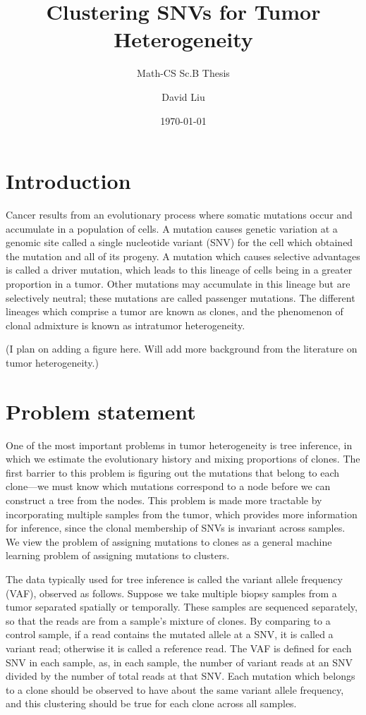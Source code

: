 \documentclass[11pt]{article}
\title{Clustering SNVs for Tumor Heterogeneity}
\subtitle{Math-CS Sc.B Thesis}
\date{\today}
\author{David Liu}
\begin{document}
\maketitle
\section{Introduction}
Cancer results from an evolutionary process where somatic mutations occur and accumulate in a population of cells. A mutation causes genetic variation at a genomic site called a single nucleotide variant (SNV) for the cell which obtained the mutation and all of its progeny. A mutation which causes selective advantages is called a driver mutation, which leads to this lineage of cells being in a greater proportion in a tumor. Other mutations may accumulate in this lineage but are selectively neutral; these mutations are called passenger mutations. The different lineages which comprise a tumor are known as clones, and the phenomenon of clonal admixture is known as intratumor heterogeneity. 

(I plan on adding a figure here. Will add more background from the literature on tumor heterogeneity.)

\section{Problem statement}
One of the most important problems in tumor heterogeneity is tree inference, in which we estimate the evolutionary history and mixing proportions of clones. The first barrier to this problem is figuring out the mutations that belong to each clone---we must know which mutations correspond to a node before we can construct a tree from the nodes. This problem is made more tractable by incorporating multiple samples from the tumor, which provides more information for inference, since the clonal membership of SNVs is invariant across samples. We view the problem of assigning mutations to clones as a general machine learning problem of assigning mutations to clusters.

The data typically used for tree inference is called the variant allele frequency (VAF), observed as follows. Suppose we take multiple biopsy samples from a tumor separated spatially or temporally. These samples are sequenced separately, so that the reads are from a sample's mixture of clones. By comparing to a control sample, if a read contains the mutated allele at a SNV, it is called a variant read; otherwise it is called a reference read. The VAF is defined for each SNV in each sample, as, in each sample, the number of variant reads at an SNV divided by the number of total reads at that SNV. Each mutation which belongs to a clone should be observed to have about the same variant allele frequency, and this clustering should be true for each clone across all samples.
\end{document}
